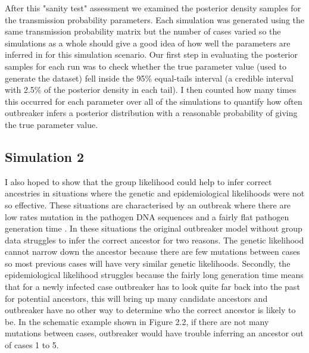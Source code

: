 \documentclass[11pt,a4paper]{report}
\begin{document}
After this "sanity test" assessment we examined the posterior density samples for the transmission probability parameters. Each simulation was generated using the same transmission probability matrix but the number of cases varied so the simulations as a whole should give a good idea of how well the parameters are inferred in for this simulation scenario. Our first step in evaluating the posterior samples for each run was to check whether the true parameter value (used to generate the dataset) fell inside the 95\% equal-tails interval (a credible interval with 2.5\% of the posterior density in each tail). I then counted how many times this occurred for each parameter over all of the simulations to quantify how often outbreaker infers a posterior distribution with a reasonable probability of giving the true parameter value.
\subsection{Simulation 2}
I also hoped to show that the group likelihood could help to infer correct ancestries in situations where the genetic and epidemiological likelihoods were not so effective. These situations are characterised by an outbreak where there are low rates mutation in the pathogen DNA sequences and a fairly flat pathogen generation time \citep{outbrkr}. In these situations the original outbreaker model without group data struggles to infer the correct ancestor for two reasons. The genetic likelihood cannot narrow down the ancestor because there are few mutations between cases so most previous cases will have very similar genetic likelihoods. Secondly, the epidemiological likelihood struggles because the fairly long generation time means that for a newly infected case outbreaker has to look quite far back into the past for potential ancestors, this will bring up many candidate ancestors and outbreaker have no other way to determine who the correct ancestor is likely to be. In the schematic example shown in Figure 2.2, if there are not many mutations between cases, outbreaker would have trouble inferring an ancestor out of cases 1 to 5.
\\
\end{document}

